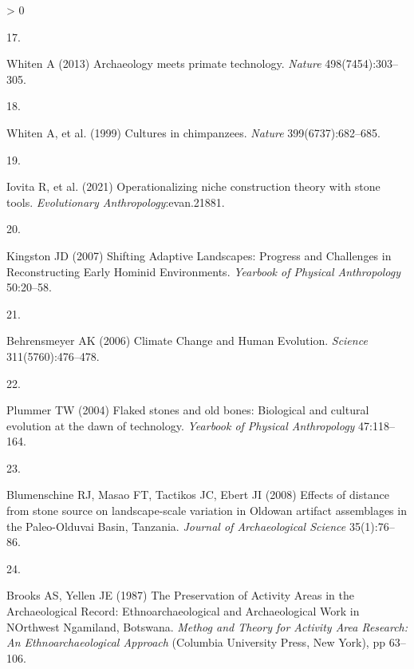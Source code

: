 \documentclass[9pt,twocolumn,twoside,]{pnas-new}
\newlength{\csllabelwidth}
\newlength{\cslhangindent}
\newenvironment{CSLReferences}[3] %
 {%
  \setlength{\parindent}{0pt}
  \ifodd #1 \everypar{\setlength{\hangindent}{\cslhangindent}}\ignorespaces\fi
  \ifnum #2 > 0
  \setlength{\parskip}{#2\baselineskip}
  \fi
 }%
 {}
\newcommand{\CSLLeftMargin}[1]{\parbox[t]{\csllabelwidth}{#1}}
\newcommand{\CSLRightInline}[1]{\parbox[t]{\linewidth - \csllabelwidth}{#1}}
\begin{document}
\begin{CSLReferences}{0}{0}
\leavevmode\hypertarget{ref-whitenArchaeologyMeetsPrimate2013}{}%
\CSLLeftMargin{17. }
\CSLRightInline{Whiten A (2013) Archaeology meets primate technology.
\emph{Nature} 498(7454):303--305.}

\leavevmode\hypertarget{ref-whitenCulturesChimpanzees1999}{}%
\CSLLeftMargin{18. }
\CSLRightInline{Whiten A, et al. (1999) Cultures in chimpanzees.
\emph{Nature} 399(6737):682--685.}

\leavevmode\hypertarget{ref-iovitaOperationalizingNicheConstruction2021}{}%
\CSLLeftMargin{19. }
\CSLRightInline{Iovita R, et al. (2021) Operationalizing niche
construction theory with stone tools. \emph{Evolutionary
Anthropology}:evan.21881.}

\leavevmode\hypertarget{ref-kingstonShiftingAdaptiveLandscapes2007}{}%
\CSLLeftMargin{20. }
\CSLRightInline{Kingston JD (2007) Shifting {Adaptive Landscapes}:
{Progress} and {Challenges} in {Reconstructing Early Hominid
Environments}. \emph{Yearbook of Physical Anthropology} 50:20--58.}

\leavevmode\hypertarget{ref-behrensmeyerClimateChangeHuman2006}{}%
\CSLLeftMargin{21. }
\CSLRightInline{Behrensmeyer AK (2006) Climate {Change} and {Human
Evolution}. \emph{Science} 311(5760):476--478.}

\leavevmode\hypertarget{ref-plummerFlakedStonesOld2004}{}%
\CSLLeftMargin{22. }
\CSLRightInline{Plummer TW (2004) Flaked stones and old bones:
{Biological} and cultural evolution at the dawn of technology.
\emph{Yearbook of Physical Anthropology} 47:118--164.}

\leavevmode\hypertarget{ref-blumenschineEffectsDistanceStone2008}{}%
\CSLLeftMargin{23. }
\CSLRightInline{Blumenschine RJ, Masao FT, Tactikos JC, Ebert JI (2008)
Effects of distance from stone source on landscape-scale variation in
{Oldowan} artifact assemblages in the {Paleo}-{Olduvai Basin},
{Tanzania}. \emph{Journal of Archaeological Science} 35(1):76--86.}

\leavevmode\hypertarget{ref-brooksPreservationActivityAreas1987}{}%
\CSLLeftMargin{24. }
\CSLRightInline{Brooks AS, Yellen JE (1987) The {Preservation} of
{Activity Areas} in the {Archaeological Record}: {Ethnoarchaeological}
and {Archaeological Work} in {NOrthwest Ngamiland}, {Botswana}.
\emph{Methog and {Theory} for {Activity Area Research}: {An
Ethnoarchaeological Approach}} ({Columbia University Press}, {New
York}), pp 63--106.}

\end{CSLReferences}



% 
\end{document}
